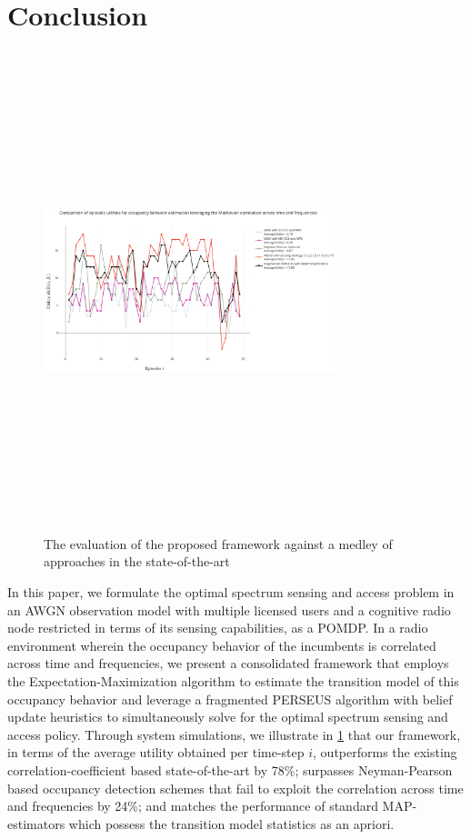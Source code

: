 \documentclass[10pt,twocolumn]{IEEEtran}
\begin{document}
\section{Conclusion}\label{V}
\begin{figure}
    \centering
    \includegraphics[width=8.5cm,height=14cm,keepaspectratio]{ComparisonWithSoA.png}
    \caption{The evaluation of the proposed framework against a medley of approaches in the state-of-the-art}
    \label{fig:7}
\end{figure}
In this paper, we formulate the optimal spectrum sensing and access problem in an AWGN observation model with multiple licensed users and a cognitive radio node restricted in terms of its sensing capabilities, as a POMDP. In a radio environment wherein the occupancy behavior of the incumbents is correlated across time and frequencies, we present a consolidated framework that employs the Expectation-Maximization algorithm to estimate the transition model of this occupancy behavior and leverage a fragmented PERSEUS algorithm with belief update heuristics to simultaneously solve for the optimal spectrum sensing and access policy. Through system simulations, we illustrate in \ref{fig:7} that our framework, in terms of the average utility obtained per time-step $i$, outperforms the existing correlation-coefficient based state-of-the-art by 78\%; surpasses Neyman-Pearson based occupancy detection schemes that fail to exploit the correlation across time and frequencies by 24\%; and matches the performance of standard MAP-estimators which possess the transition model statistics as an apriori.


\end{document}
